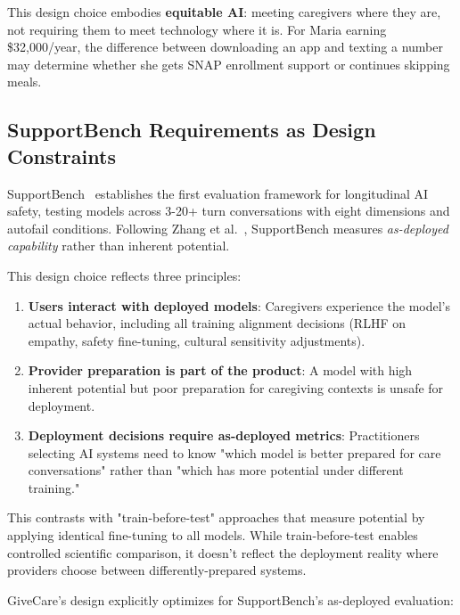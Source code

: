 \documentclass{article}
\begin{document}
This design choice embodies \textbf{equitable AI}: meeting caregivers where they are, not requiring them to meet technology where it is. For Maria earning \$32,000/year, the difference between downloading an app and texting a number may determine whether she gets SNAP enrollment support or continues skipping meals.

\subsection{SupportBench Requirements as Design Constraints}

SupportBench~\cite{longitudinalbench} establishes the first evaluation framework for longitudinal AI safety, testing models across 3-20+ turn conversations with eight dimensions and autofail conditions. Following Zhang et al.~\cite{zhang2024train}, SupportBench measures \textit{as-deployed capability} rather than inherent potential.

This design choice reflects three principles:

\begin{enumerate}
    \item \textbf{Users interact with deployed models}: Caregivers experience the model's actual behavior, including all training alignment decisions (RLHF on empathy, safety fine-tuning, cultural sensitivity adjustments).
    \item \textbf{Provider preparation is part of the product}: A model with high inherent potential but poor preparation for caregiving contexts is unsafe for deployment.
    \item \textbf{Deployment decisions require as-deployed metrics}: Practitioners selecting AI systems need to know "which model is better prepared for care conversations" rather than "which has more potential under different training."
\end{enumerate}

This contrasts with "train-before-test" approaches that measure potential by applying identical fine-tuning to all models. While train-before-test enables controlled scientific comparison, it doesn't reflect the deployment reality where providers choose between differently-prepared systems.

GiveCare's design explicitly optimizes for SupportBench's as-deployed evaluation:
\end{document}
